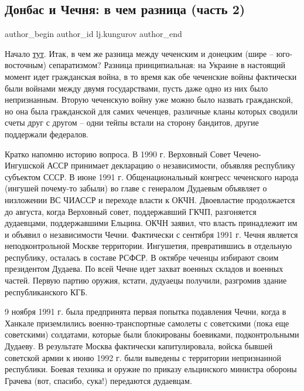  
 
 
 
 
\subsection{Донбас и Чечня: в чем разница (часть 2)}
\label{sec:06_05_2014.lj.kungurov.1.donbass_chechnja_dva}


\ifcmt
 author_begin
   author_id lj.kungurov
 author_end
\fi

Начало \href{https://kungurov.livejournal.com/84905.html}{тут}. Итак, в чем же
разница между чеченским и донецким (шире – юго-восточным) сепаратизмом? Разница
принципиальная: на Украине в настоящий момент идет гражданская война, в то
время как обе чеченские войны фактически были войнами между двумя
государствами, пусть даже одно из них было непризнанным. Вторую чеченскую войну
уже можно было назвать гражданской, но она была гражданской для самих чеченцев,
различные кланы которых сводили счеты друг с другом – одни тейпы встали на
сторону бандитов, другие поддержали федералов.

Кратко напомню историю вопроса. В 1990 г. Верховный Совет Чечено-Ингушской АССР
принимает декларацию о независимости, объявляя республику субъектом СССР.  В
июне 1991 г. Общенациональный конгресс чеченского народа (ингушей почему-то
забыли) во главе с генералом Дудаевым объявляет о низложении ВС ЧИАССР и
переходе власти к ОКЧН. Двоевластие продолжается до августа, когда Верховный
совет, поддержавший ГКЧП, разгоняется дудаевцами, поддержавшими Ельцина. ОКЧН
заявил, что власть принадлежит им и объявил о независимости Чечни. Фактически с
сентября 1991 г. Чечня является неподконтрольной Москве территории. Ингушетия,
превратившись в отдельную республику, осталась в составе РСФСР. В октябре
чеченцы избирают своим президентом Дудаева. По всей Чечне идет захват военных
складов и военных частей. Первую партию оружия, кстати, дудуаецы получили,
разгромив здание республиканского КГБ.

9 ноября 1991 г. была предпринята первая попытка подавления Чечни, когда в
Ханкале приземлились военно-транспортные самолеты с советскими (пока еще
советскими) солдатами, которые были блокированы боевиками, подконтрольными
Дудаеву. В результате Москва фактически капитулировала, войска бывшей советской
армии к июню 1992 г. были выведены с территории непризнанной республики. Боевая
техника и оружие по приказу ельцинского министра обороны Грачева (вот, спасибо,
сука!) передаются дудаевцам.

